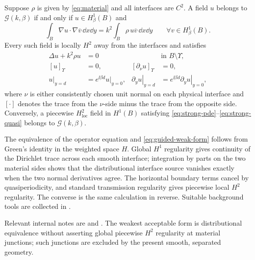 \begin{proposition}
\label{prop:weak-strong}
Suppose $\rho$ is given by \eqref{eq:material} and all interfaces are $C^2$.
A field $u$ belongs to $\mathcal G(k,\beta)$ if and only if
$u\in H^1_\beta(B)$ and
\begin{equation}
  \int_B\nabla u\cdot\nabla\overline v\,\dd x\dd y
  =k^2\int_B\rho\,u\overline v\,\dd x\dd y
  \qquad\forall v\in H^1_\beta(B).
  \label{eq:guided-weak-form}
\end{equation}
Every such field is locally $H^2$ away from the interfaces and satisfies
\begin{align}
  \Delta u+k^2\rho u&=0&&\text{in }B\setminus\Upsilon,\label{eq:strong-pde}\\
  [u]_{\Upsilon}&=0,&[\partial_\nu u]_{\Upsilon}&=0,\label{eq:TM-jumps}\\
  \left.u\right|_{y=d}
    &=e^{\ii\beta d}\left.u\right|_{y=0},&
  \left.\partial_yu\right|_{y=d}
    &=e^{\ii\beta d}\left.\partial_yu\right|_{y=0},
    \label{eq:strong-quasi}
\end{align}
where $\nu$ is either consistently chosen unit normal on each physical
interface and $[\cdot]$ denotes the trace from the $\nu$-side minus the trace
from the opposite side.  Conversely, a piecewise $H^2_{\mathrm{loc}}$ field
in $H^1(B)$ satisfying \eqref{eq:strong-pde}--\eqref{eq:strong-quasi} belongs
to $\mathcal G(k,\beta)$.
\end{proposition}
\begin{proofroadmap}
The equivalence of the operator equation and \eqref{eq:guided-weak-form}
follows from Green's identity in the weighted space $H$.  Global
$H^1$ regularity gives continuity of the Dirichlet trace across each smooth
interface; integration by parts on the two material sides shows that the
distributional interface source vanishes exactly when the two normal
derivatives agree.  The horizontal boundary terms cancel by quasiperiodicity,
and standard transmission regularity gives piecewise local $H^2$ regularity.
The converse is the same calculation in reverse.  Suitable background tools
are collected in \cite[Chapters~3--4]{McLean2000}.

Relevant internal notes are
 and
.
The weakest acceptable form is distributional equivalence without asserting
global piecewise $H^2$ regularity at material junctions; such junctions are
excluded by the present smooth, separated geometry.
\end{proofroadmap}
